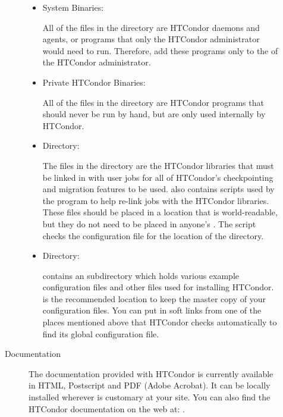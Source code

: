 \begin{description}
\begin{description}
\begin{itemize}
     \item System Binaries:

     All of the files in the  directory are HTCondor daemons and
     agents, or programs that only the HTCondor administrator would need
     to run.  Therefore, add these programs only
     to the  of the HTCondor administrator.

     \item Private HTCondor Binaries:

     All of the files in the  directory are HTCondor
     programs that should never be run by hand, but are only used
     internally by HTCondor. 

     \item {} Directory:

     The files in the  directory are the HTCondor libraries that
     must be linked in with user jobs for all of HTCondor's
     checkpointing and migration features to be used.   also
     contains scripts used by the  program to help
     re-link jobs with the HTCondor libraries.  These files should be
     placed in a location that is world-readable, but they do not need
     to be placed in anyone's .  The  script checks
     the configuration file for the location of the  directory.

     \item {} Directory:

      contains an  subdirectory which holds various
     example configuration files and other files used for installing HTCondor.
      is the recommended location to keep the master copy of your
     configuration files.  You can put in soft links from one of the places
     mentioned above that HTCondor checks automatically to find its
     global configuration file. 
\end{itemize}

\item[Documentation]

The documentation provided with HTCondor is currently available in
     HTML, Postscript and PDF (Adobe Acrobat).  It can be locally installed
     wherever is customary at your site.  You can also find the HTCondor
     documentation on the web at:
     .

\end{description}


\end{description}
